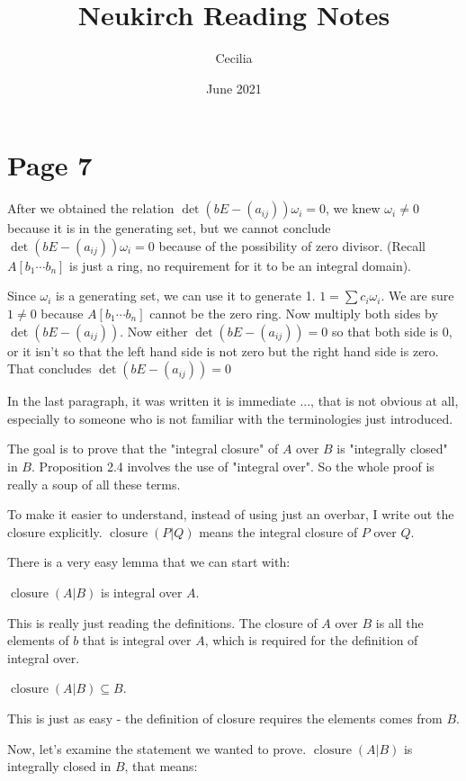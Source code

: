 \documentclass{article}
\title{Neukirch Reading Notes}
\author{Cecilia}
\date{June 2021}
\DeclareMathOperator{\closure}{closure}
\begin{document}
\maketitle

\section*{Page 7}
After we obtained the relation $ \det(bE - (a_{ij}))\omega_i = 0 $, we knew $ \omega_i \ne 0 $ because it is in the generating set, but we cannot conclude $ \det(bE - (a_{ij}))\omega_i = 0 $ because of the possibility of zero divisor. (Recall $ A[b_1 \cdots b_n] $ is just a ring, no requirement for it to be an integral domain).

Since $ \omega_i $ is a generating set, we can use it to generate 1. $ 1 = \sum c_i \omega_i $. We are sure $ 1 \ne 0 $ because $ A[b_1 \cdots b_n ] $ cannot be the zero ring. Now multiply both sides by $ \det(bE - (a_{ij})) $. Now either $ \det(bE - (a_{ij})) = 0 $ so that both side is 0, or it isn't so that the left hand side is not zero but the right hand side is zero. That concludes $ \det(bE - (a_{ij})) = 0 $

In the last paragraph, it was written it is immediate ..., that is not obvious at all, especially to someone who is not familiar with the terminologies just introduced.

The goal is to prove that the "integral closure" of $ A $ over $ B $ is "integrally closed" in $ B $. Proposition 2.4 involves the use of "integral over". So the whole proof is really a soup of all these terms.

To make it easier to understand, instead of using just an overbar, I write out the closure explicitly. $ \closure(P|Q) $ means the integral closure of $ P $ over $ Q $.

There is a very easy lemma that we can start with:

$ \closure(A | B) $ is integral over $ A $.

This is really just reading the definitions. The closure of $ A $ over $ B $ is all the elements of $ b $ that is integral over $ A $, which is required for the definition of integral over.

$ \closure(A | B) \subseteq B $.

This is just as easy - the definition of closure requires the elements comes from $ B $.

Now, let's examine the statement we wanted to prove. $ \closure(A | B) $ is integrally closed in $ B $, that means:
\end{document}
